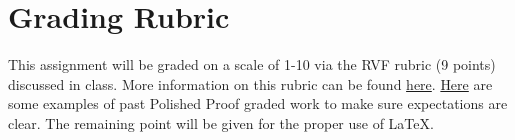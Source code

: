 \documentclass{article}
\theoremstyle{definition}
\begin{document}
\section*{Grading Rubric}
    This assignment will be graded on a scale of 1-10 via the RVF rubric (9 points) discussed in class. 
    More information on this rubric can be found 
    \href{https://drive.google.com/file/d/1P0OBjw-GkX64uCpYcqYmXARapf9MwaiI/view?usp=sharing}{here}. 
    \href{https://drive.google.com/file/d/1KAFQ7GBFpfUkyTBRZ30h5o6nXWwYDSML/view?usp=sharing}{Here} 
    are some examples of past Polished Proof graded work to make sure expectations are clear. 
    The remaining point will be given for the proper use of \LaTeX.
	
\end{document}
